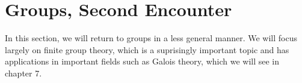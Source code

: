 \chapter{Groups, Second Encounter}

In this section, we will return to groups in a less general manner. We will focus largely on finite group theory, which is a suprisingly important topic and has applications in important fields such as Galois theory, which we will see in chapter 7.






